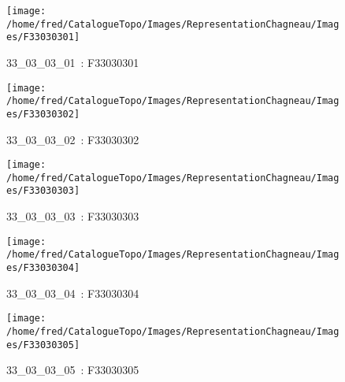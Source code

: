 \documentclass[12pt,titlepage,oneside]{book}
\begin{document}
\begin{figure}[h!]
  \hfill         %
  \begin{minipage}[t]{3cm}
    \begin{center}
      \texttt{[image: /home/fred/CatalogueTopo/Images/RepresentationChagneau/Images/F33030301]}
      \caption[~33\_03\_03\_01]{\small{33\_03\_03\_01~:} \tiny{F33030301}}\label{F33030301}
    \end{center}
  \end{minipage}
  \begin{minipage}[t]{3cm}
    \begin{center}
      \texttt{[image: /home/fred/CatalogueTopo/Images/RepresentationChagneau/Images/F33030302]}
      \caption[~33\_03\_03\_02]{\small{33\_03\_03\_02~:} \tiny{F33030302}}\label{F33030302}
    \end{center}
  \end{minipage}
  \begin{minipage}[t]{3cm}
    \begin{center}
      \texttt{[image: /home/fred/CatalogueTopo/Images/RepresentationChagneau/Images/F33030303]}
      \caption[~33\_03\_03\_03]{\small{33\_03\_03\_03~:} \tiny{F33030303}}\label{F33030303}
    \end{center}
  \end{minipage}
  \begin{minipage}[t]{3cm}
    \begin{center}
      \texttt{[image: /home/fred/CatalogueTopo/Images/RepresentationChagneau/Images/F33030304]}
      \caption[~33\_03\_03\_04]{\small{33\_03\_03\_04~:} \tiny{F33030304}}\label{F33030304}
    \end{center}
  \end{minipage}
  \begin{minipage}[t]{3cm}
    \begin{center}
      \texttt{[image: /home/fred/CatalogueTopo/Images/RepresentationChagneau/Images/F33030305]}
      \caption[~33\_03\_03\_05]{\small{33\_03\_03\_05~:} \tiny{F33030305}}\label{F33030305}
    \end{center}
  \end{minipage}
\end{figure}
\end{document}
